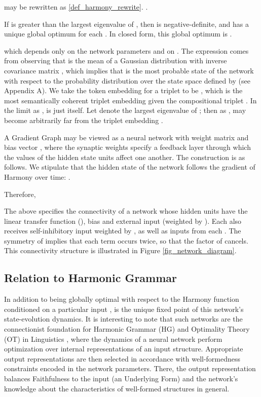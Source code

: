 \documentclass[a4paper,10pt]{article}
\begin{document}
 may be rewritten as \ref{def_harmony_rewrite}. 
\ex. \\\phantom{h}\hfill \label{def_harmony_rewrite}

If  is greater than the largest eigenvalue of , then  is negative-definite, and  has a unique global optimum  for each . In closed form, this global optimum is
\ex.  \label{def_mu_x}

which depends only on the network parameters and on . The expression  comes from observing that  is the mean of a Gaussian distribution with inverse covariance matrix , which implies that  is the most probable state  of the network with respect to the probability distribution over the state space defined by  (see Appendix A). We take the token embedding for a triplet  to be , which is the most semantically coherent triplet embedding given the compositional triplet . In the limit as ,  is just  itself. Let  denote the largest eigenvalue of ; then as ,  may become arbitrarily far from the triplet embedding .

A Gradient Graph may be viewed as a neural network with weight matrix  and bias vector , where the synaptic weights  specify a feedback layer through which the values of the hidden state units affect one another. The construction is as follows. We stipulate that the hidden state of the network follows the gradient of Harmony over time:
\ex. 

Therefore, 

The above specifies the connectivity of a network whose hidden units have the linear transfer function (), bias  and external input  (weighted by ). Each  also receives self-inhibitory input weighted by , as well as inputs  from each . The symmetry of  implies that each term  occurs twice, so that the factor of  cancels. This connectivity structure is illustrated in Figure \ref{fig_network_diagram}. 

\subsection{Relation to Harmonic Grammar}
In addition to being globally optimal with respect to the Harmony function  conditioned on a particular input ,  is the unique fixed point of this network's state-evolution dynamics. It is interesting to note that such networks are the connectionist foundation for Harmonic Grammar (HG) and Optimality Theory (OT) in Linguistics \cite{smolensky_legendre2006harmonic_mind}, where the dynamics of a neural network perform optimization over internal representations of an input structure. Appropriate output representations are then selected in accordance with well-formedness constraints encoded in the network parameters. There, the output representation balances Faithfulness to the input (an Underlying Form) and the network's knowledge about the characteristics of well-formed structures in general. 
\end{document}
